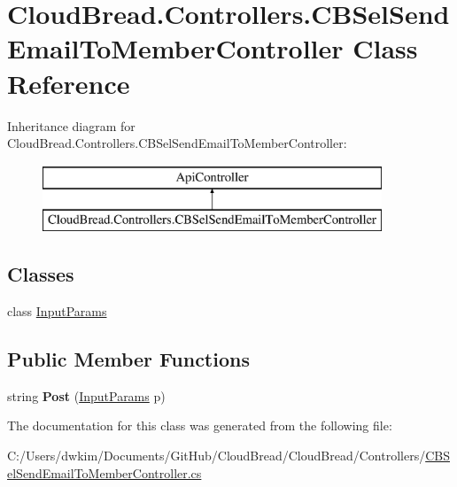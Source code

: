 \hypertarget{class_cloud_bread_1_1_controllers_1_1_c_b_sel_send_email_to_member_controller}{}\section{Cloud\+Bread.\+Controllers.\+C\+B\+Sel\+Send\+Email\+To\+Member\+Controller Class Reference}
\label{class_cloud_bread_1_1_controllers_1_1_c_b_sel_send_email_to_member_controller}
Inheritance diagram for Cloud\+Bread.\+Controllers.\+C\+B\+Sel\+Send\+Email\+To\+Member\+Controller\+:\begin{figure}[H]
\begin{center}
\leavevmode
\includegraphics[height=2.000000cm]{class_cloud_bread_1_1_controllers_1_1_c_b_sel_send_email_to_member_controller}
\end{center}
\end{figure}
\subsection*{Classes}
\begin{DoxyCompactItemize}
\item 
class \hyperlink{class_cloud_bread_1_1_controllers_1_1_c_b_sel_send_email_to_member_controller_1_1_input_params}{Input\+Params}
\end{DoxyCompactItemize}
\subsection*{Public Member Functions}
\begin{DoxyCompactItemize}
\item 
string {\bfseries Post} (\hyperlink{class_cloud_bread_1_1_controllers_1_1_c_b_sel_send_email_to_member_controller_1_1_input_params}{Input\+Params} p)\hypertarget{class_cloud_bread_1_1_controllers_1_1_c_b_sel_send_email_to_member_controller_a1e0e460211039ff78137d64d7d4a1958}{}\label{class_cloud_bread_1_1_controllers_1_1_c_b_sel_send_email_to_member_controller_a1e0e460211039ff78137d64d7d4a1958}

\end{DoxyCompactItemize}


The documentation for this class was generated from the following file\+:\begin{DoxyCompactItemize}
\item 
C\+:/\+Users/dwkim/\+Documents/\+Git\+Hub/\+Cloud\+Bread/\+Cloud\+Bread/\+Controllers/\hyperlink{_c_b_sel_send_email_to_member_controller_8cs}{C\+B\+Sel\+Send\+Email\+To\+Member\+Controller.\+cs}\end{DoxyCompactItemize}
